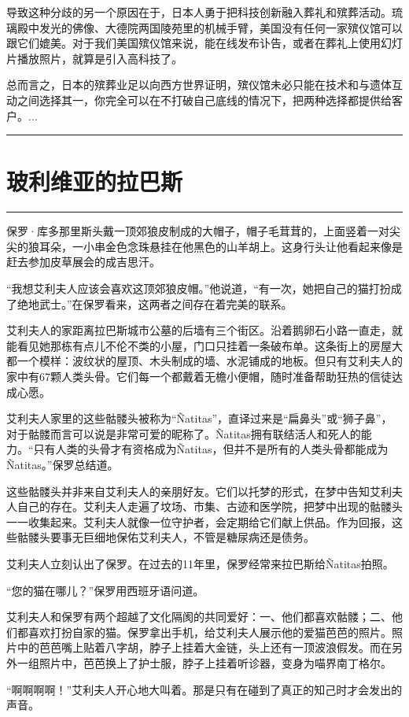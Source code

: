 \documentclass[12pt,oneside]{book}
\newcommand\hr{\par\noindent\hrule}
\begin{document}
导致这种分歧的另一个原因在于，日本人勇于把科技创新融入葬礼和殡葬活动。琉璃殿中发光的佛像、大德院两国陵苑里的机械手臂，美国没有任何一家殡仪馆可以跟它们媲美。对于我们美国殡仪馆来说，能在线发布讣告，或者在葬礼上使用幻灯片播放照片，就算是引入高科技了。

总而言之，日本的殡葬业足以向西方世界证明，殡仪馆未必只能在技术和与遗体互动之间选择其一，你完全可以在不打破自己底线的情况下，把两种选择都提供给客户。...

\hr  


\section{玻利维亚的拉巴斯}
\hr  
保罗·库多那里斯头戴一顶郊狼皮制成的大帽子，帽子毛茸茸的，上面竖着一对尖尖的狼耳朵，一小串金色念珠悬挂在他黑色的山羊胡上。这身行头让他看起来像是赶去参加皮草展会的成吉思汗。

“我想艾利夫人应该会喜欢这顶郊狼皮帽。”他说道，“有一次，她把自己的猫打扮成了绝地武士。”在保罗看来，这两者之间存在着完美的联系。

艾利夫人的家距离拉巴斯城市公墓的后墙有三个街区。沿着鹅卵石小路一直走，就能看见她那栋有点儿不伦不类的小屋，门口只挂着一条破布单。这条街上的房屋大都一个模样：波纹状的屋顶、木头制成的墙、水泥铺成的地板。但只有艾利夫人的家中有67颗人类头骨。它们每一个都戴着无檐小便帽，随时准备帮助狂热的信徒达成心愿。

艾利夫人家里的这些骷髅头被称为“Ñatitas”，直译过来是“扁鼻头”或“狮子鼻”，对于骷髅而言可以说是非常可爱的昵称了。Ñatitas拥有联结活人和死人的能力。“只有人类的头骨才有资格成为Ñatitas，但并不是所有的人类头骨都能成为Ñatitas。”保罗总结道。

这些骷髅头并非来自艾利夫人的亲朋好友。它们以托梦的形式，在梦中告知艾利夫人自己的存在。艾利夫人走遍了坟场、市集、古迹和医学院，把梦中出现的骷髅头一一收集起来。艾利夫人就像一位守护者，会定期给它们献上供品。作为回报，这些骷髅头要事无巨细地保佑艾利夫人，不管是糖尿病还是债务。

艾利夫人立刻认出了保罗。在过去的11年里，保罗经常来拉巴斯给Ñatitas拍照。

“您的猫在哪儿？”保罗用西班牙语问道。

艾利夫人和保罗有两个超越了文化隔阂的共同爱好：一、他们都喜欢骷髅；二、他们都喜欢打扮自家的猫。保罗拿出手机，给艾利夫人展示他的爱猫芭芭的照片。照片中的芭芭嘴上贴着八字胡，脖子上挂着大金链，头上还有一顶波浪假发。而在另外一组照片中，芭芭换上了护士服，脖子上挂着听诊器，变身为喵界南丁格尔。

“啊啊啊啊！”艾利夫人开心地大叫着。那是只有在碰到了真正的知己时才会发出的声音。
\end{document}
